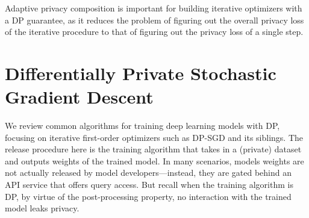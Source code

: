 Adaptive privacy composition is important for building iterative optimizers with a DP guarantee, as it reduces the problem of figuring out the overall privacy loss of the iterative procedure to that of figuring out the privacy loss of a single step.

\section[Differentially Private Stochastic Gradient Descent]{\large Differentially Private Stochastic Gradient Descent}
We review common algorithms for training deep learning models with DP, focusing on iterative first-order optimizers such as DP-SGD and its siblings.
The release procedure here is the training algorithm that takes in a (private) dataset and outputs weights of the trained model.
In many scenarios, models weights are not actually released by model developers---instead, they are gated behind an API service that offers query access.
But recall when the training algorithm is DP, by virtue of the post-processing property, no interaction with the trained model leaks privacy.

